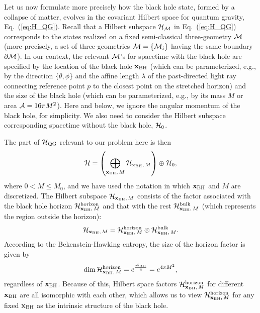 \documentclass[12pt]{article}
\begin{document}
Let us now formulate more precisely how the black hole state, formed 
by a collapse of matter, evolves in the covariant Hilbert space for 
quantum gravity, Eq.~(\ref{eq:H_QG}).  Recall that a Hilbert subspace 
${\cal H}_{\cal M}$ in Eq.~(\ref{eq:H_QG}) corresponds to the states 
realized on a fixed semi-classical three-geometry ${\cal M}$ (more precisely, 
a set of three-geometries ${\cal M} = \{ {\cal M}_i \}$ having the same 
boundary $\partial {\cal M}$).  In our context, the relevant ${\cal M}$'s 
for spacetime with the black hole are specified by the location of the 
black hole ${\bf x}_{\rm BH}$ (which can be parameterized, e.g., by the 
direction $\{ \theta, \phi \}$ and the affine length $\lambda$ of the 
past-directed light ray connecting reference point $p$ to the closest 
point on the stretched horizon) and the size of the black hole (which 
can be parameterized, e.g., by its mass $M$ or area ${\cal A} = 16\pi 
M^2$).  Here and below, we ignore the angular momentum of the black 
hole, for simplicity.  We also need to consider the Hilbert subspace 
corresponding spacetime without the black hole, ${\cal H}_0$.

The part of ${\cal H}_{\rm QG}$ relevant to our problem here is then
%
\begin{equation}
  {\cal H} = \left( \bigoplus_{{\bf x}_{\rm BH},\, M} 
    {\cal H}_{{\bf x}_{\rm BH},\, M} \right) \oplus {\cal H}_0,
\label{eq:H}
\end{equation}
%
where $0 < M \leq M_0$, and we have used the notation in which 
${\bf x}_{\rm BH}$ and $M$ are discretized.  The Hilbert subspace 
${\cal H}_{{\bf x}_{\rm BH},\, M}$ consists of the factor associated 
with the black hole horizon ${\cal H}_{{\bf x}_{\rm BH},\, M}^{\rm 
horizon}$ and that with the rest ${\cal H}_{{\bf x}_{\rm BH},\, 
M}^{\rm bulk}$ (which represents the region outside the horizon):
%
\begin{equation}
  {\cal H}_{{\bf x}_{\rm BH},\, M} = 
    {\cal H}_{{\bf x}_{\rm BH},\, M}^{\rm horizon} \otimes
    {\cal H}_{{\bf x}_{\rm BH},\, M}^{\rm bulk}.
\label{eq:H-xM}
\end{equation}
%
According to the Bekenstein-Hawking entropy, the size of the horizon factor 
is given by
%
\begin{equation}
  {\rm dim}\, {\cal H}_{{\bf x}_{\rm BH},\, M}^{\rm horizon} 
    = e^{\frac{{\cal A}_{\rm BH}}{4}}
    = e^{4\pi M^2},
\label{eq:dim-horizon}
\end{equation}
%
regardless of ${\bf x}_{\rm BH}$.  Because of this, Hilbert space 
factors ${\cal H}_{{\bf x}_{\rm BH},\, M}^{\rm horizon}$ for different 
${\bf x}_{\rm BH}$ are all isomorphic with each other, which allows us 
to view ${\cal H}_{{\bf x}_{\rm BH},\, M}^{\rm horizon}$ for any fixed 
${\bf x}_{\rm BH}$ as the intrinsic structure of the black hole.
\end{document}
